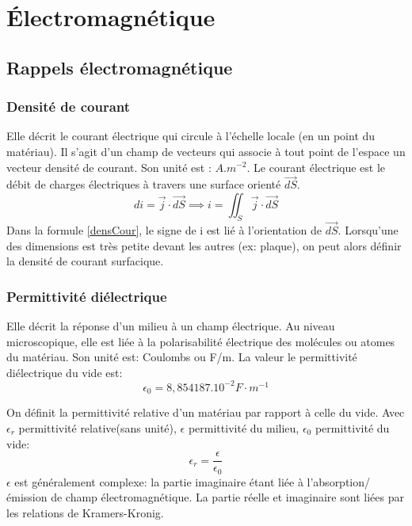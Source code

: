 \documentclass[10pt,a4paper]{article}
\begin{document}
\section{Électromagnétique}
\subsection{Rappels électromagnétique}

\subsubsection{Densité de courant \cite{denscour}}
Elle décrit le courant électrique qui circule à l'échelle locale (en un point du matériau). Il s'agit d'un champ de vecteurs qui associe à tout point de l'espace un vecteur densité de courant. Son unité est : $A.m^{-2}$. Le courant électrique est le débit de charges électriques à travers une surface orienté $\overrightarrow{dS}$.
\begin{equation}
di = \overrightarrow{j}\cdot\overrightarrow{dS} \implies i = \iint_{S}\overrightarrow{j}\cdot\overrightarrow{dS}
\label{densCour}
\end{equation}
Dans la formule \ref{densCour}, le signe de i est lié à l'orientation de $\overrightarrow{dS}$.
Lorsqu'une des dimensions est très petite devant les autres (ex: plaque), on peut alors définir la densité de courant surfacique.

\subsubsection{Permittivité diélectrique \cite{permelec}}
Elle décrit la réponse d'un milieu à un champ électrique. Au niveau microscopique, elle est liée à la polarisabilité électrique des molécules ou atomes du matériau. Son unité est: Coulombs ou F/m.
La valeur le permittivité diélectrique du vide est:
\begin{equation}
\epsilon_{0} = 8,854187.10^{-2} F\cdot m^{-1}
\end{equation}

On définit la permittivité relative d'un matériau par rapport à celle du vide. Avec $\epsilon_{r}$ permittivité relative(sans unité), $\epsilon$ permittivité du milieu, $\epsilon_{0}$ permittivité du vide:
\begin{equation}
\epsilon_{r} = \frac{\epsilon}{\epsilon_{0}}
\end{equation}
$\epsilon$ est généralement complexe: la partie imaginaire étant liée à l'absorption/émission de champ électromagnétique. La partie réelle et imaginaire sont liées par les relations de Kramers-Kronig.
\end{document}

